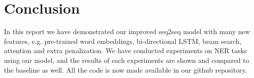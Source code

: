 \documentclass[11pt,a4paper]{article}
\begin{document}









\section{Conclusion} \label{sec:conclusion}
In this report we have demonstrated our improved seq2seq model with many new features, e.g. pre-trained word embeddings, bi-directional LSTM, beam search, attention and extra penalization. We have conducted experiments on NER tasks using our model, and the results of each experiments are shown and compared to the baseline as well. All the code is now made available in our github repository. 
\end{document}
